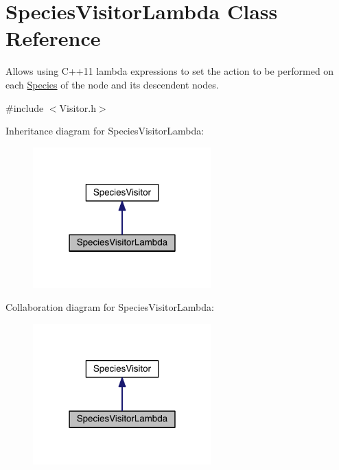 \hypertarget{classSpeciesVisitorLambda}{\section{Species\+Visitor\+Lambda Class Reference}
\label{classSpeciesVisitorLambda}
}


Allows using C++11 lambda expressions to set the action to be performed on each \hyperlink{classSpecies}{Species} of the node and its descendent nodes.  




{\ttfamily \#include $<$Visitor.\+h$>$}



Inheritance diagram for Species\+Visitor\+Lambda\+:
\nopagebreak
\begin{figure}[H]
\begin{center}
\leavevmode
\includegraphics[width=195pt]{classSpeciesVisitorLambda__inherit__graph}
\end{center}
\end{figure}


Collaboration diagram for Species\+Visitor\+Lambda\+:
\nopagebreak
\begin{figure}[H]
\begin{center}
\leavevmode
\includegraphics[width=195pt]{classSpeciesVisitorLambda__coll__graph}
\end{center}
\end{figure}
